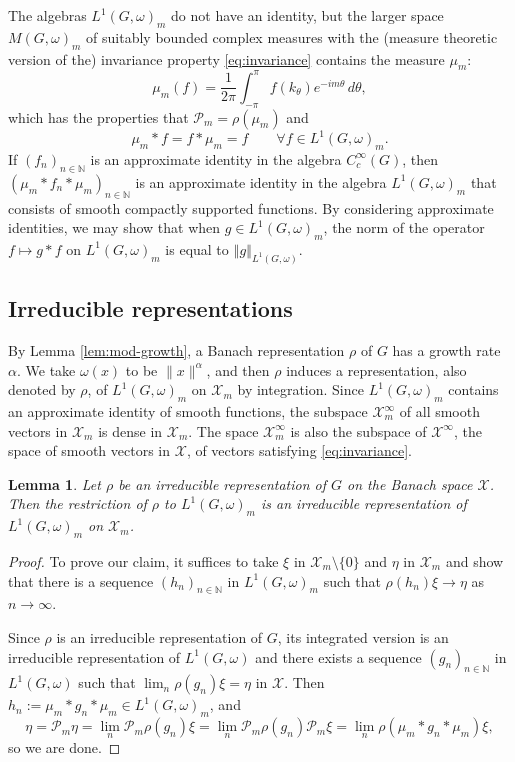 \documentclass[12pt,a4paper]{amsart}
\newtheorem{lem}[thm]{Lemma}
\theoremstyle{definition}
\theoremstyle{remark}
\numberwithin{equation}{section}
\newcommand{\norm}[1]{\left\Vert#1\right\Vert}
\newcommand{\N}{\mathbb{N}}
\newcommand{\Ban}{\mathcal{X}}
\newcommand{\rep}{\rho}
\begin{document}
The algebras $L^1(G,\omega)_m$ do not have an identity, but the larger space $M(G,\omega)_m$ of suitably bounded complex measures with the (measure theoretic version of the) invariance property \eqref{eq:invariance} contains the measure $\mu_m$:
\[
\mu_m(f) = \frac{1}{2\pi} \int_{-\pi}^{\pi} f(k_\theta) e^{-im\theta} \,d\theta,
\]
which has the properties  that $\mathcal P_m =\rep (\mu_m)$ and
\[
\mu_m *f = f* \mu_m = f 
\qquad\forall f \in L^1(G,\omega)_m.
\]
If $(f_n)_{n\in\N}$ is an approximate identity in the algebra $C^\infty_c(G)$, then $(\mu_m*f_n*\mu_m)_{n\in\N}$ is an approximate identity in the algebra $L^1(G,\omega)_m$ that consists of smooth compactly supported functions.
By considering approximate identities, we may show that when $g \in L^1(G,\omega)_m$, the norm of the operator $f \mapsto g * f$ on $L^1(G,\omega)_m$ is equal to $\norm{g}_{L^1(G,\omega)}$.


\subsection*{Irreducible representations}
By Lemma \ref{lem:mod-growth}, a Banach representation $\rep$ of $G$ has a growth rate $\alpha$.
We take $\omega(x)$ to be $\|x\|^\alpha$, and then $\rep$ induces a representation, also denoted by $\rho$, of $L^1(G,\omega)_{m}$ on $\Ban_{m}$ by integration.
Since $L^1(G,\omega)_{m}$ contains an approximate identity of smooth functions, the subspace $\Ban_m^\infty$ of all smooth vectors in $\Ban_m$ is dense in $\Ban_m$.
The space $\Ban_m^\infty$ is also the subspace of $\Ban^\infty$, the space of smooth vectors in $\Ban$, of vectors satisfying \eqref{eq:invariance}.

\begin{lem}\label{lem:irred-on-L1m}
Let $\rho$ be an irreducible representation of $G$ on the Banach space $\Ban$.
Then the restriction of $\rho$ to $L^1(G,\omega)_m$ is an irreducible representation of $L^1(G,\omega)_m$  on $\Ban_m$.
\end{lem}

\begin{proof}
To prove our claim, it suffices to take $\xi$ in $\Ban_m\setminus\{0\}$ and $\eta$ in $\Ban_m$ and show that there is a sequence $(h_n)_{n\in\N}$ in $L^1(G,\omega)_m$ such that $\rho(h_n) \xi \to \eta$ as $n \to \infty$.

Since $\rho$ is an irreducible representation of $G$, its integrated version is an irreducible representation of $L^1(G,\omega)$ and there exists a sequence $(g_n)_{n\in\N}$ in $L^1(G,\omega)$ such that $\lim_n \rep(g_n) \xi = \eta$ in $\Ban$.
Then $h_n := \mu_m * g_n * \mu_m \in L^1(G,\omega)_m$, and
\[
\eta 
=\mathcal{P}_m \eta 
= \lim_n \mathcal{P}_m \rep(g_n) \xi 
= \lim_n \mathcal{P}_m \rep(g_n) \mathcal{P}_m \xi 
= \lim_n  \rep(\mu_m * g_n * \mu_m) \xi ,
\]
so we are done.
\end{proof}
\end{document}
